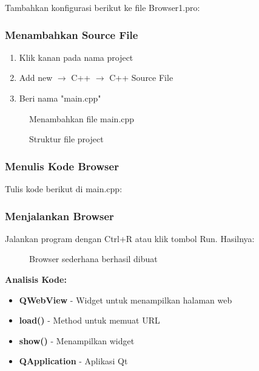 Tambahkan konfigurasi berikut ke file Browser1.pro:



\subsubsection{Menambahkan Source File}

\begin{enumerate}
\item Klik kanan pada nama project
\item Add new $\rightarrow$ C++ $\rightarrow$ C++ Source File
\item Beri nama "main.cpp"
\end{enumerate}

\begin{figure}[htbp]
\centering
{}
\caption{Menambahkan file main.cpp}
\end{figure}

\begin{figure}[htbp]
\centering
{}
\caption{Struktur file project}
\end{figure}

\subsubsection{Menulis Kode Browser}

Tulis kode berikut di main.cpp:



\subsubsection{Menjalankan Browser}

Jalankan program dengan Ctrl+R atau klik tombol Run. Hasilnya:

\begin{figure}[htbp]
\centering
{}
\caption{Browser sederhana berhasil dibuat}
\end{figure}

\textbf{Analisis Kode:}
\begin{itemize}
\item \textbf{QWebView} - Widget untuk menampilkan halaman web
\item \textbf{load()} - Method untuk memuat URL
\item \textbf{show()} - Menampilkan widget
\item \textbf{QApplication} - Aplikasi Qt
\end{itemize}

